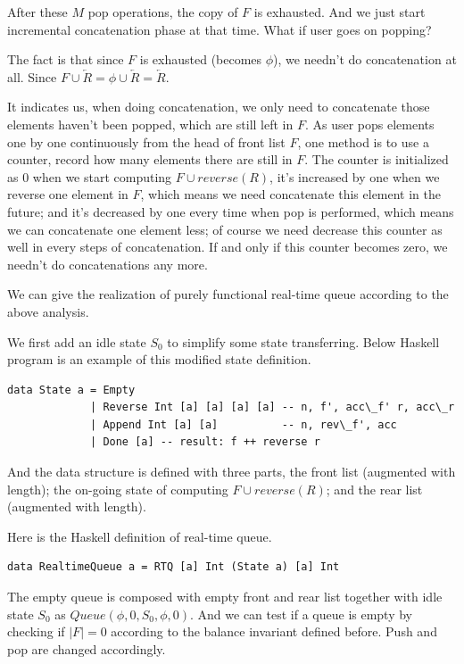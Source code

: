 \documentclass[b5paper]{article}
\begin{document}
After these $M$ pop operations, the copy of $F$ is exhausted. And we just
start incremental concatenation phase at that time. What if user goes
on popping?

The fact is that since $F$ is exhausted (becomes $\phi$), we needn't do concatenation
at all. Since $F \cup \overleftarrow{R} = \phi \cup \overleftarrow{R} = \overleftarrow{R}$.

It indicates us, when doing concatenation, we only need to concatenate those elements
haven't been popped, which are still left in $F$. As user pops elements one by one
continuously from the head of front list $F$, one method is to use a counter,
record how many elements there are still in $F$. The counter is initialized as 0
when we start computing $F \cup reverse(R)$, it's increased by one when we reverse
one element in $F$, which means we need concatenate this element in the future;
and it's decreased by one every time when pop is
performed, which means we can concatenate one element less; of course we need decrease
this counter as well in every steps of concatenation. If and only if this counter
becomes zero, we needn't do concatenations any more.

We can give the realization of purely functional real-time queue according to the above
analysis.

We first add an idle state $S_0$ to simplify some state transferring. Below Haskell program
is an example of this modified state definition.

\lstset{language=Haskell}
\begin{lstlisting}
data State a = Empty
             | Reverse Int [a] [a] [a] [a] -- n, f', acc\_f' r, acc\_r
             | Append Int [a] [a]          -- n, rev\_f', acc
             | Done [a] -- result: f ++ reverse r
\end{lstlisting}

And the data structure is defined with three parts, the front list (augmented with length);
the on-going state of computing $F \cup reverse(R)$; and the rear list (augmented with length).

Here is the Haskell definition of real-time queue.

\lstset{language=Haskell}
\begin{lstlisting}
data RealtimeQueue a = RTQ [a] Int (State a) [a] Int
\end{lstlisting}

The empty queue is composed with empty front and rear list together with idle state $S_0$ as
$Queue(\phi, 0, S_0, \phi, 0)$. And we can test if a queue is empty by checking if $|F| = 0$
according
to the balance invariant defined before. Push and pop are changed accordingly.
\end{document}
